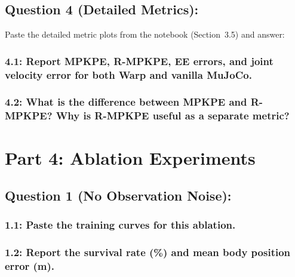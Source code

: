 \documentclass[12pt]{article}
\begin{document}
\subsection*{Question 4 (Detailed Metrics):}
Paste the detailed metric plots from the notebook (Section~3.5) and answer:

\subsubsection*{4.1: Report MPKPE, R-MPKPE, EE errors, and joint velocity error for both Warp and vanilla MuJoCo.}
\begin{solution}[height=10cm]
\end{solution}

\subsubsection*{4.2: What is the difference between MPKPE and R-MPKPE? Why is R-MPKPE useful as a separate metric?}
\begin{solution}[height=7cm]
\end{solution}


\newpage
\section*{Part 4: Ablation Experiments}

\subsection*{Question 1 (No Observation Noise):}

\subsubsection*{1.1: Paste the training curves for this ablation.}
\begin{solution}[height=10cm]
\end{solution}

\subsubsection*{1.2: Report the survival rate (\%) and mean body position error (m).}
\begin{solution}[height=4cm]
\end{solution}
\end{document}
